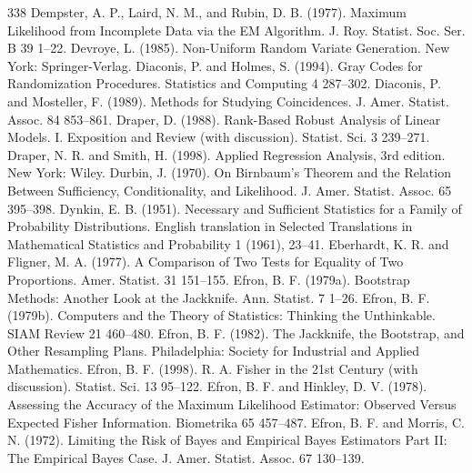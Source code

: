 \begin{thebibliography}{338}
\label{bib:source97} Dempster, A. P., Laird, N. M., and Rubin, D. B. (1977). Maximum Likelihood from Incomplete Data via the EM Algorithm. J. Roy. Statist. Soc. Ser. B 39 1–22.
\label{bib:source98} Devroye, L. (1985). Non-Uniform Random Variate Generation. New York: Springer-Verlag.
\label{bib:source99} Diaconis, P. and Holmes, S. (1994). Gray Codes for Randomization Procedures. Statistics and Computing 4 287–302.
\label{bib:source100} Diaconis, P. and Mosteller, F. (1989). Methods for Studying Coincidences. J. Amer. Statist. Assoc. 84 853–861.
\label{bib:source101} Draper, D. (1988). Rank-Based Robust Analysis of Linear Models. I. Exposition and Review (with discussion). Statist. Sci. 3 239–271.
\label{bib:source102} Draper, N. R. and Smith, H. (1998). Applied Regression Analysis, 3rd edition. New York: Wiley.
\label{bib:source103} Durbin, J. (1970). On Birnbaum’s Theorem and the Relation Between Sufficiency, Conditionality, and Likelihood. J. Amer. Statist. Assoc. 65 395–398.
\label{bib:source104} Dynkin, E. B. (1951). Necessary and Sufficient Statistics for a Family of Probability Distributions. English translation in Selected Translations in Mathematical Statistics and Probability 1 (1961), 23–41.
\label{bib:source105} Eberhardt, K. R. and Fligner, M. A. (1977). A Comparison of Two Tests for Equality of Two Proportions. Amer. Statist. 31 151–155.
\label{bib:source106} Efron, B. F. (1979a). Bootstrap Methods: Another Look at the Jackknife. Ann. Statist. 7 1–26.
\label{bib:source107} Efron, B. F. (1979b). Computers and the Theory of Statistics: Thinking the Unthinkable. SIAM Review 21 460–480.
\label{bib:source108} Efron, B. F. (1982). The Jackknife, the Bootstrap, and Other Resampling Plans. Philadelphia: Society for Industrial and Applied Mathematics.
\label{bib:source109} Efron, B. F. (1998). R. A. Fisher in the 21st Century (with discussion). Statist. Sci. 13 95–122.
\label{bib:source110} Efron, B. F. and Hinkley, D. V. (1978). Assessing the Accuracy of the Maximum Likelihood Estimator: Observed Versus Expected Fisher Information. Biometrika 65 457–487.
\label{bib:source111} Efron, B. F. and Morris, C. N. (1972). Limiting the Risk of Bayes and Empirical Bayes Estimators Part II: The Empirical Bayes Case. J. Amer. Statist. Assoc. 67 130–139.

\end{thebibliography}

